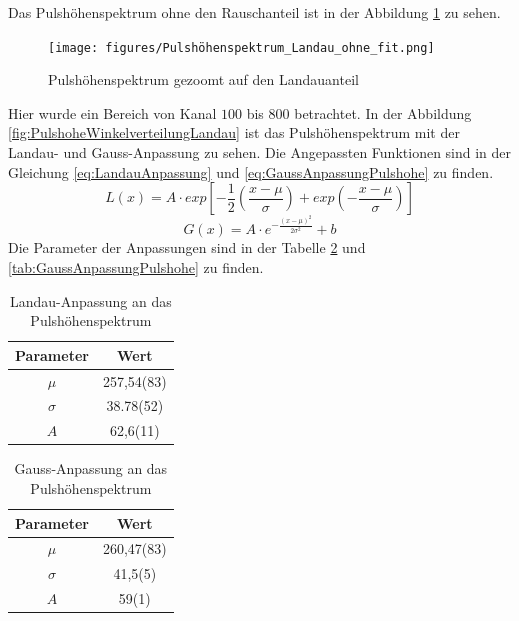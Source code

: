\documentclass{article}
\begin{document}
Das Pulshöhenspektrum ohne den Rauschanteil ist in der Abbildung \ref{fig:PulshoheWinkelverteilungLandauOhneFit} zu sehen.
\begin{figure}
    \centering
    \texttt{[image: figures/Pulshöhenspektrum\_Landau\_ohne\_fit.png]}
    \caption{Pulshöhenspektrum gezoomt auf den Landauanteil}
    \label{fig:PulshoheWinkelverteilungLandauOhneFit}
\end{figure}
Hier wurde ein Bereich von Kanal $100$ bis $800$ betrachtet.
In der Abbildung \ref{fig:PulshoheWinkelverteilungLandau} ist das Pulshöhenspektrum mit der Landau- und Gauss-Anpassung zu sehen.
Die Angepassten Funktionen sind in der Gleichung \ref{eq:LandauAnpassung} und \ref{eq:GaussAnpassungPulshohe} zu finden.
\begin{displaymath}
    L(x) = A \cdot exp\left[ -\frac{1}{2} \left( \frac{x - \mu}{\sigma} \right) + exp\left( -\frac{x - \mu }{\sigma} \right) \right] 
\label{eq:LandauAnpassung}
\end{displaymath}
\begin{displaymath}
    G(x) = A \cdot e^{-\frac{(x - \mu)^2}{2\sigma^2}} + b
\label{eq:GaussAnpassungPulshohe}
\end{displaymath}
Die Parameter der Anpassungen sind in der Tabelle \ref{tab:LandauAnpassungPulshohe} und \ref{tab:GaussAnpassungPulshohe} zu finden.
\begin{table}[H]
    \centering
    \caption{Landau-Anpassung an das Pulshöhenspektrum}
    \begin{tabular}{|c|c|}
        \hline
        Parameter & Wert \\ \hline
        $\mu$ & 257,54(83) \\ \hline
        $\sigma$ & 38.78(52) \\ \hline
        $A$ & 62,6(11) \\ \hline
    \end{tabular}
    \label{tab:LandauAnpassungPulshohe}
\end{table}
\begin{table}[H]
    \centering
    \caption{Gauss-Anpassung an das Pulshöhenspektrum}
    \begin{tabular}{|c|c|}
        \hline
        Parameter & Wert \\ \hline
        $\mu$ & 260,47(83) \\ \hline
        $\sigma$ & 41,5(5) \\ \hline
        $A$ & 59(1) \\ \hline
    \end{tabular}
    \label{tab:LandauAnpassungPulshohe}
\end{table}
\end{document}
